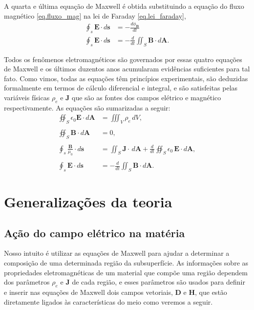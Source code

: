 A quarta e última equação de Maxwell é obtida substituindo a equação do fluxo magnético \ref{eq.fluxo_mag} na lei de Faraday \ref{eq.lei_faraday},
\begin{align*}
\oint_s\mathbf{E}\cdot d\mathbf{s}&=-\frac{d\phi_\mathbf{B}}{dt}\\
\oint_s\mathbf{E}\cdot d\mathbf{s}&=-\frac{d}{dt}\iint_S\mathbf{B}\cdot d\mathbf{A}.
\end{align*}

Todos os fenômenos eletromagnéticos são governados por essas quatro equações de Maxwell  e os últimos duzentos anos acumularam evidências suficientes para tal fato. Como vimos, todas as equações têm princípios experimentais, são deduzidas formalmente em termos de cálculo diferencial e integral, e são satisfeitas pelas variáveis físicas $\rho_e$ e $\mathbf{J}$ que são as fontes dos campos elétrico e magnético respectivamente. As equações são sumarizadas a seguir:
\begin{align}\label{eq.maxwell_1}
\oiint_S\epsilon_0\textbf{E}\cdot\textit{d}\textbf{A}&=\iiint_{V}\rho_e\,dV,\\\nonumber\\\label{eq.maxwell_2}
\oiint_S\textbf{B}\cdot\textit{d}\textbf{A}&=0,\\\nonumber\\\label{eq.maxwell_3}
\oint_s\frac{\mathbf{B}}{\mu_0}\cdot d\mathbf{s}&=\iint_S\mathbf{J}\cdot\,d\mathbf{A}+\frac{d}{dt}\oiint_S\epsilon_0\,\textbf{E}\cdot\textit{d}\textbf{A},\\\nonumber\\\label{eq.maxwell_4}
\oint_s\mathbf{E}\cdot d\mathbf{s}&=-\frac{d}{dt}\iint_S\mathbf{B}\cdot d\mathbf{A}.
\end{align}

\section{Generalizações da teoria}

\subsection{Ação do campo elétrico na matéria}

Nosso intuito é utilizar as equações de Maxwell para ajudar a determinar a composição de uma determinada região da subsuperfície. As informa\c{c}\~oes sobre as propriedades eletromagnéticas de um material que compõe uma região dependem dos parâmetros $\rho_e$ e $\mathbf{J}$ de cada região, e esses parâmetros são usados para definir e inserir nas equações de Maxwell dois campos vetoriais, $\mathbf{D}$ e $\mathbf{H}$, que estão diretamente ligados às características do meio como veremos a seguir.

